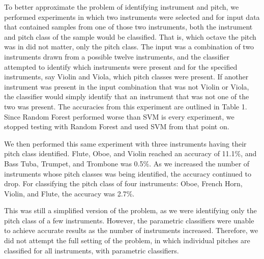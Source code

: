 \documentclass{article}
\begin{document}
To better approximate the problem of identifying instrument and pitch, we performed experiments in which two instruments were selected and for input data that contained samples from one of those two instruments, both the instrument and pitch class of the sample would be classified. That is, which octave the pitch was in did not matter, only the pitch class. The input was a combination of two instruments drawn from a possible twelve instruments, and the classifier attempted to identify which instruments were present and for the specified instruments, say Violin and Viola, which pitch classes were present. If another instrument was present in the input combination that was not Violin or Viola, the classifier would simply identify that an instrument that was not one of the two was present. The accuracies from this experiment are outlined in Table 1. Since Random Forest performed worse than SVM is every experiment, we stopped testing with Random Forest and used SVM from that point on.

We then performed this same experiment with three instruments having their pitch class identified. Flute, Oboe, and Violin reached an accuracy of 11.1\%, and Bass Tuba, Trumpet, and Trombone was 0.5\%. As we increased the number of instruments whose pitch classes was being identified, the accuracy continued to drop. For classifying the pitch class of four instruments: Oboe, French Horn, Violin, and Flute, the accuracy was 2.7\%.

This was still a simplified version of the problem, as we were identifying only the pitch class of a few instruments. However, the parametric classifiers were unable to achieve accurate results as the number of instruments increased. Therefore, we did not attempt the full setting of the problem, in which individual pitches are classified for all instruments, with parametric classifiers. 
\end{document}
